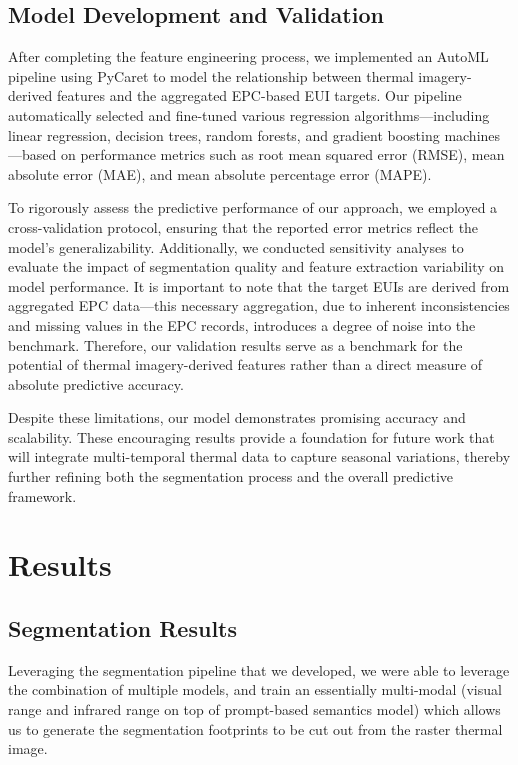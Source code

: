 \documentclass[preprint,12pt]{elsarticle}
\begin{document}
    
    \subsection{Model Development and Validation}
    After completing the feature engineering process, we implemented an AutoML pipeline using PyCaret to model the relationship between thermal imagery-derived features and the aggregated EPC-based EUI targets. Our pipeline automatically selected and fine-tuned various regression algorithms—including linear regression, decision trees, random forests, and gradient boosting machines—based on performance metrics such as root mean squared error (RMSE), mean absolute error (MAE), and mean absolute percentage error (MAPE). 
    
    To rigorously assess the predictive performance of our approach, we employed a cross-validation protocol, ensuring that the reported error metrics reflect the model’s generalizability. Additionally, we conducted sensitivity analyses to evaluate the impact of segmentation quality and feature extraction variability on model performance. It is important to note that the target EUIs are derived from aggregated EPC data—this necessary aggregation, due to inherent inconsistencies and missing values in the EPC records, introduces a degree of noise into the benchmark. Therefore, our validation results serve as a benchmark for the potential of thermal imagery-derived features rather than a direct measure of absolute predictive accuracy.
    
    Despite these limitations, our model demonstrates promising accuracy and scalability. These encouraging results provide a foundation for future work that will integrate multi-temporal thermal data to capture seasonal variations, thereby further refining both the segmentation process and the overall predictive framework.
    
    
\section{Results}
    \subsection{Segmentation Results}%
    Leveraging the segmentation pipeline that we developed, we were able to leverage the combination of multiple models, and train an essentially multi-modal (visual range and infrared range on top of prompt-based semantics model) which allows us to generate the segmentation footprints to be cut out from the raster thermal image. 
\end{document}
